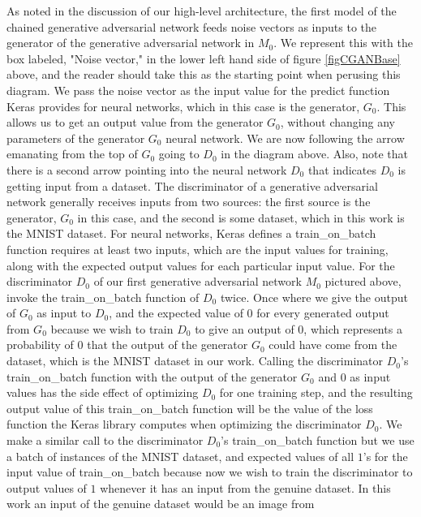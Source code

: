 \documentclass[conference]{IEEEtran}
\begin{document}
As noted in the discussion of our high-level architecture, the first model of
the chained generative adversarial network feeds noise vectors as inputs to 
the generator of the generative adversarial network in $M_{0}$.  We represent
this with the box labeled, "Noise vector," in the lower left hand side of figure
\ref{figCGANBase} above, and the reader should take this as the starting point
when perusing this diagram.  We pass the noise vector as the input value for
the predict function Keras provides for neural networks, which in this case is 
the generator, $G_{0}$.  This allows us to get an output value from the
generator $G_{0}$, without changing any parameters of the generator $G_{0}$
neural network.  We are now following the arrow emanating from the top of
$G_{0}$ going to $D_{0}$ in the diagram above.  Also, note that there is a second 
arrow pointing into the neural network $D_{0}$ that indicates $D_{0}$ is getting
input from a dataset.  The discriminator of a generative adversarial network
generally receives inputs from two sources: the first source is the generator,
$G_{0}$ in this case, and the second is some dataset, which in this work is the
MNIST dataset.  For neural networks, Keras defines a train\_on\_batch function
requires at least two inputs, which are the input values for training, along
with the expected output values for each particular input value.  For the
discriminator $D_{0}$ of our first generative adversarial network $M_{0}$
pictured above, invoke the train\_on\_batch function of $D_{0}$ twice.   Once
where we give the output of $G_{0}$ as input to $D_{0}$, and the expected value 
of 0 for every generated output from $G_{0}$ because we wish to train $D_{0}$ to 
give an output of $0$, which represents a probability of $0$ that the output of
the generator $G_{0}$ could have come from the dataset, which is the MNIST
dataset in our work.  Calling the discriminator $D_0$'s train\_on\_batch
function with the output of the generator $G_{0}$ and $0$ as input values has
the side effect of optimizing $D_{0}$ for one training step, and the resulting
output value of this train\_on\_batch function will be the value of the loss
function the Keras library computes when optimizing the discriminator $D_{0}$.
We make a similar call to the discriminator $D_{0}$'s train\_on\_batch function 
but we use a batch of instances of the MNIST dataset, and expected values of all
$1$'s for the input value of train\_on\_batch because now we wish to train the
discriminator to output values of $1$ whenever it has an input from the genuine
dataset.  In this work an input of the genuine dataset would be an image from
\end{document}
